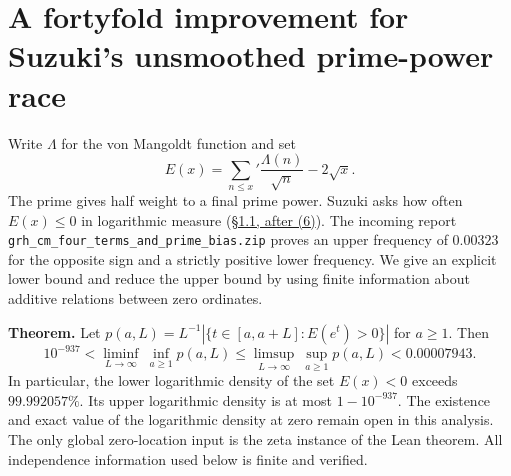 \section{A fortyfold improvement for Suzuki's unsmoothed prime-power race}
\label{sec:suzukimoments}
Write $\Lambda$ for the von Mangoldt function and set
\[
 E(x)=\sum_{n\le x}'\frac{\Lambda(n)}{\sqrt n}-2\sqrt x .
\]
The prime gives half weight to a final prime power. Suzuki asks how often
$E(x)\le0$ in logarithmic measure (\href{https://arxiv.org/html/2411.07436v3}{\S1.1, after (6)}).
The incoming report \texttt{grh\_cm\_four\_terms\_and\_prime\_bias.zip}
proves an upper frequency of $0.00323$ for the opposite sign and a
strictly positive lower frequency. We give an explicit lower bound and reduce the upper bound by using
finite information about additive relations between zero ordinates.

\medskip\noindent\textbf{Theorem.}
Let $p(a,L)=L^{-1}|\{t\in[a,a+L]:E(e^t)>0\}|$ for $a\ge1$. Then
\[
 10^{-937}<\liminf_{L\to\infty}\ \inf_{a\ge1}p(a,L)
 \le\limsup_{L\to\infty}\ \sup_{a\ge1}p(a,L)<0.00007943 .
\]
In particular, the lower logarithmic density of the set $E(x)<0$ exceeds
$99.992057\%$. Its upper logarithmic density is at most $1-10^{-937}$. The existence and exact value of the logarithmic density
at zero remain open in this analysis. The only global zero-location input
is the zeta instance of the Lean theorem. All independence information
used below is finite and verified.

